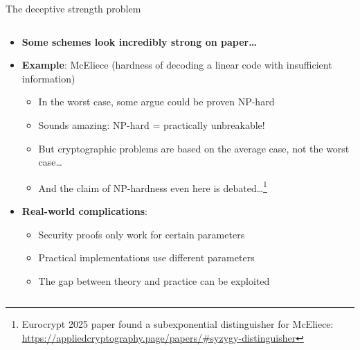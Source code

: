 \documentclass[aspectratio=169, lualatex, handout]{beamer}
\begin{document}
\begin{frame}{The deceptive strength problem}
	\begin{columns}[c]
		\begin{column}{1\textwidth}
			\begin{itemize}
				\item \textbf{Some schemes look incredibly strong on paper\ldots}
				\item \textbf{Example}: McEliece (hardness of decoding a linear code with insufficient information)
				      \begin{itemize}
					      \item In the worst case, some argue could be proven NP-hard
					      \item Sounds amazing: NP-hard = practically unbreakable!
					      \item But cryptographic problems are based on the average case, not the worst case\ldots
					      \item And the claim of NP-hardness even here is debated\ldots\footnote{Eurocrypt 2025 paper found a subexponential distinguisher for McEliece: \url{https://appliedcryptography.page/papers/\#syzygy-distinguisher}}
				      \end{itemize}
				\item \textbf{Real-world complications}:
				      \begin{itemize}
					      \item Security proofs only work for certain parameters
					      \item Practical implementations use different parameters
					      \item The gap between theory and practice can be exploited
				      \end{itemize}
			\end{itemize}
		\end{column}
	\end{columns}
\end{frame}
\end{document}
